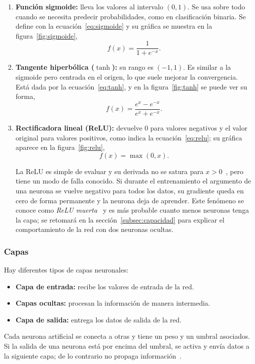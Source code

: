 \documentclass[titlepage,11pt]{article}
\begin{document}
\begin{enumerate}
\item \textbf{Función sigmoide:} lleva los valores al intervalo $(0,1)$. Se usa
  sobre todo cuando se necesita predecir probabilidades, como en clasificación
  binaria. Se define con la ecuación~\eqref{eq:sigmoide} y su gráfica se
  muestra en la figura~\ref{fig:sigmoide},
  \begin{equation}
    f(x)=\frac{1}{1+e^{-x}}.
    \label{eq:sigmoide}
  \end{equation}

\item \textbf{Tangente hiperbólica ($\tanh$):} su rango es $(-1,1)$. Es similar
  a la sigmoide pero centrada en el origen, lo que suele mejorar la
  convergencia. Está dada por la ecuación~\eqref{eq:tanh}, y en la
  figura~\ref{fig:tanh} se puede ver su forma,
  \begin{equation}
    f(x)=\frac{e^{x}-e^{-x}}{e^{x}+e^{-x}}.
    \label{eq:tanh}
  \end{equation}

\item \textbf{Rectificadora lineal (ReLU):} devuelve 0 para valores negativos y
  el valor original para valores positivos, como indica la
  ecuación~\eqref{eq:relu}; su gráfica aparece en la figura~\ref{fig:relu},
  \begin{equation}
    f(x)=\max(0,x).
    \label{eq:relu}
  \end{equation}

  La ReLU es simple de evaluar y su derivada no se satura para
  $x>0$~\cite{goodfellow_2016_deep}, pero
  tiene un modo de falla conocido. Si durante el entrenamiento el argumento de
  una neurona se vuelve negativo para todos los datos, su gradiente queda en
  cero de forma permanente y la neurona deja de aprender. Este fenómeno se
  conoce como \emph{ReLU muerta}~\cite{lu_2020_dying} y es más probable cuanto menos neuronas tenga
  la capa; se retomará en la sección~\ref{subsec:capacidad} para explicar el
  comportamiento de la red con dos neuronas ocultas.
\end{enumerate}

\subsubsection{Capas}
Hay diferentes tipos de capas neuronales:
\begin{itemize}
\item \textbf{Capa de entrada:} recibe los valores de entrada de la red.
\item \textbf{Capas ocultas:} procesan la información de manera intermedia.
\item \textbf{Capa de salida:} entrega los datos de salida de la red.
\end{itemize}
Cada neurona artificial se conecta a otras y tiene un peso y un umbral
asociados. Si la salida de una neurona está por encima del umbral, se activa y
envía datos a la siguiente capa; de lo contrario no propaga
información~\cite{antonio_2023_introduccin,ibm_qu}.
\end{document}
